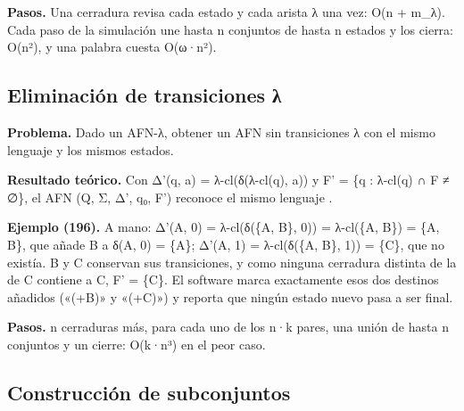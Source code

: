 \textbf{Pasos.} Una cerradura revisa cada estado y cada arista λ una vez: O(n + m\_λ). Cada paso de la simulación une hasta n conjuntos de hasta n estados y los cierra: O(n²), y una palabra cuesta O(\textbar ω\textbar·n²).

\hypertarget{eliminaciuxf3n-de-transiciones-ux3bb}{%
\subsection{Eliminación de transiciones λ}\label{eliminaciuxf3n-de-transiciones-ux3bb}}

\textbf{Problema.} Dado un AFN-λ, obtener un AFN sin transiciones λ con el mismo lenguaje y los mismos estados.

\textbf{Resultado teórico.} Con Δ'(q, a) = λ-cl(δ(λ-cl(q), a)) y F' = \{q : λ-cl(q) ∩ F ≠ ∅\}, el AFN (Q, Σ, Δ', q₀, F') reconoce el mismo lenguaje \autocites[sec.~2.5.5]{hopcroft2007}[sec.~1.2, demostración del teorema 1.39]{sipser2013}.

\begin{Shaded}
\begin{Highlighting}[]
\end{Highlighting}
\end{Shaded}

\textbf{Ejemplo (196).} A mano: Δ'(A, 0) = λ-cl(δ(\{A, B\}, 0)) = λ-cl(\{A, B\}) = \{A, B\}, que añade B a δ(A, 0) = \{A\}; Δ'(A, 1) = λ-cl(δ(\{A, B\}, 1)) = \{C\}, que no existía. B y C conservan sus transiciones, y como ninguna cerradura distinta de la de C contiene a C, F' = \{C\}. El software marca exactamente esos dos destinos añadidos («(+B)» y «(+C)») y reporta que ningún estado nuevo pasa a ser final.

\textbf{Pasos.} n cerraduras más, para cada uno de los n·k pares, una unión de hasta n conjuntos y un cierre: O(k·n³) en el peor caso.

\hypertarget{construcciuxf3n-de-subconjuntos}{%
\subsection{Construcción de subconjuntos}\label{construcciuxf3n-de-subconjuntos}}

